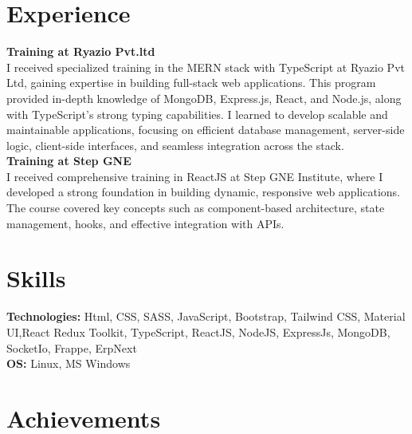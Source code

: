 \documentclass[letterpaper, 8pt]{article}
\newcommand{\secStartSpace}{\vspace{3pt}}
\newcommand{\secEndSpace}{\vspace{4pt}}
\begin{document}
\section{\color{blue} \textbf{Experience}}
\secStartSpace


\begin{addmargin}[1em]{1em}
\noindent \textbf{Training at Ryazio Pvt.ltd} 
\\
I received specialized training in the MERN stack with TypeScript at Ryazio Pvt Ltd, gaining expertise in building full-stack web applications. This program provided in-depth knowledge of MongoDB, Express.js, React, and Node.js, along with TypeScript's strong typing capabilities. I learned to develop scalable and maintainable applications, focusing on efficient database management, server-side logic, client-side interfaces, and seamless integration across the stack.
\\
\noindent \textbf{Training at Step GNE} 
\\
I received comprehensive training in ReactJS at Step GNE Institute, where I developed a strong foundation in building dynamic, responsive web applications. The course covered key concepts such as component-based architecture, state management, hooks, and effective integration with APIs.
\end{addmargin}
\secEndSpace
\n
\section{\color{blue} \textbf{Skills}}
\secStartSpace

\begin{addmargin}[1em]{1em}
	\noindent \textbf{Technologies:} Html, CSS, SASS, JavaScript, Bootstrap, Tailwind CSS, Material UI,React Redux Toolkit, TypeScript, ReactJS, NodeJS, ExpressJs, MongoDB, SocketIo, Frappe, ErpNext \\
	\noindent \textbf{OS:} Linux, MS Windows\\
\end{addmargin}
\secEndSpace


\section{\color{blue} \textbf{Achievements}}
\secStartSpace
\end{document}
